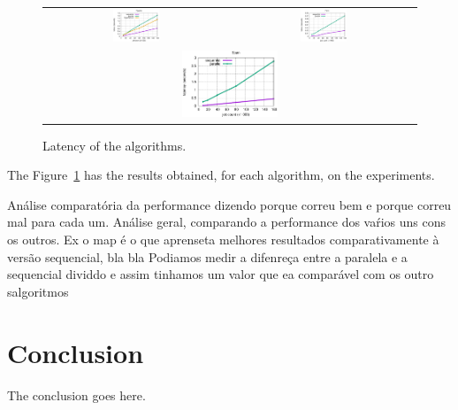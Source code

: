 \documentclass[conference,compsoc]{IEEEtran}
\begin{document}
\begin{figure}[h!]
\begin{tabular}{cc}
    \includegraphics[width=0.265\textwidth]{plots/Pipeline.eps} & \includegraphics[width=0.265\textwidth]{plots/Farm.eps}\\
    \multicolumn{2}{c}{\includegraphics[width=0.265\textwidth]{plots/Scan.eps}}\\

  \end{tabular}
\caption{Latency of the algorithms.} \label{latency}
\end{figure}

The Figure~\ref{latency} has the results obtained, for each algorithm, on the experiments.

Análise comparatória da performance dizendo porque correu bem e porque correu mal para cada um.
Análise geral, comparando a performance dos vaŕios uns cons os outros. Ex o map é o que aprenseta melhores resultados comparativamente à versão sequencial, bla bla
Podiamos medir a difenreça entre a paralela e a sequencial dividdo e assim tinhamos um valor que ea comparável com os outro salgoritmos

\section{Conclusion} \label{Conclusion}
The conclusion goes here.
\end{document}
